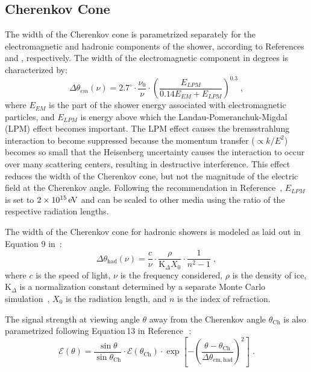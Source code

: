 \subsection{Cherenkov Cone}
\label{subsec:cherenkov_width}
The width of the Cherenkov cone is parametrized separately for the electromagnetic and hadronic components of the shower, according to References \cite{JaimeAskarian2000} and \cite{jaime05}, respectively.
The width of the electromagnetic
component in degrees is characterized by:
\begin{equation}
\label{eq:deltheta_em}
\Delta\theta_{em}(\nu)=2.7^{\circ} \cdot \frac{\nu_0}{\nu}\cdot \left(
  \frac{E_{LPM}}{ 0.14 E_{EM}+E_{LPM}} \right)^{0.3} \;,
\end{equation}
where 
$E_{EM}$ is the part of the shower energy associated with electromagnetic particles, and 
$E_{LPM}$ is energy above which the Landau-Pomeranchuk-Migdal
(LPM) effect becomes important.  
The LPM effect causes
the bremsstrahlung interaction to become suppressed because
the momentum transfer ($\propto k/E^2$) becomes so small 
that the Heisenberg uncertainty
causes the interaction to occur over many
scattering centers, resulting in destructive interference.  
This effect reduces the width of the Cherenkov cone, but not the magnitude of the electric field at the Cherenkov angle.
Following the recommendation in Reference~\cite{JaimeAskarian2000}, 
$E_{LPM}$ is set to $2\times10^{15}\mathrm{\,e\kern -0.1em V}$
and can be scaled to other media using the ratio of the respective radiation lengths.

The width of the Cherenkov cone for hadronic showers is modeled as laid out in Equation 9
in~\cite{jaime05}:
\begin{equation}
\Delta \theta_{\mathrm{had}} (\nu) =\frac{c}{\nu} \cdot
	\frac{\rho}{\mathrm{K}_{\Delta} X_0} \cdot
	\frac{1}{n^2-1} \;,
\end{equation}
\noindent where
$c$ is the speed of light,
$\nu$ is the frequency considered, 
$\rho$ is the density of ice,
$\mathrm{K}_{\Delta}$ is a normalization constant determined by a
separate Monte Carlo simulation~\cite{jaime05},
$X_0$ is the radiation length, and
$n$ is the index of refraction.

The signal strength at viewing angle $\theta$ 
away from the Cherenkov angle $\theta_{\mathrm{Ch}}$ is also parametrized following
Equation\,13 in Reference\,~\cite{jaime05}:
\begin{equation}
\mathcal{E}(\theta)=\frac{\sin{\theta}}{\sin{\theta_{\mathrm{Ch}}}} \cdot
\mathcal{E}(\theta_{\mathrm{Ch}})\cdot \exp\left[-\left(
    \frac{\theta-\theta_{\mathrm{Ch}}}{\Delta\theta_{\mathrm{em,had}}} \right)^2
\right] \;.
\end{equation}




